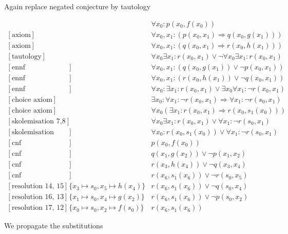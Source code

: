 \documentclass[onehalfspacing]{article}
\theoremstyle{definition}
\theoremstyle{definition}
\theoremstyle{definition}
\theoremstyle{definition}
\theoremstyle{definition}
\theoremstyle{definition}
\begin{document}
Again replace negated conjecture by tautology

\setcounter{equation}{0}
\begin{align}
	[\text{axiom}] && \forall x_0: p(x_0,f(x_0))\\
	[\text{axiom}] && \forall x_0, x_1 : (p(x_0,x_1) \Rightarrow q(x_0,g(x_1)))\\
	[\text{axiom}] && \forall x_0, x_1 : (q(x_0,x_1) \Rightarrow r(x_0,h(x_1)))\\
	[\text{tautology}] &&\forall  x_0 \exists x_1 : r(x_0,x_1)\vee \neg\forall  x_0 \exists x_1 : r(x_0,x_1)\\
	[\text{ennf transformation 2}] && \forall x_0, x_1 : (q(x_0,g(x_1)) \vee \neg p(x_0,x_1)) \\
	[\text{ennf transformation 3}] &&\forall x_0, x_1 : (r(x_0,h(x_1)) \vee \neg q(x_0, x_1)) \\
	[\text{ennf transformation 4}] && \forall  x_0 : \exists x_1 : r(x_0,x_1)\vee \exists x_0 \forall x_1 : \neg r(x_0, x_1)\\
	[\text{choice axiom}] && \exists x_0 : \forall x_1 : \neg r(x_0, x_1) \Rightarrow \forall x_1 : \neg r(s_0,x_1)\\
	[\text{choice axiom}] &&\forall x_0(\exists x_1: r(x_0, x_1)\Rightarrow r(x_0, s_1(x_0)))\\
	[\text{skolemisation 7,8}] && \forall  x_0 \exists x_1 : r(x_0,x_1)\vee \forall x_1 : \neg r(s_0, x_1)\\
	[\text{skolemisation 9,10}] && \forall  x_0 :  r(x_0, s_1(x_0))\vee \forall x_1 : \neg r(s_0, x_1)\\
	[\text{cnf transformation 1}] && p(x_0,f(x_0))\\
	[\text{cnf transformation 5}] && q(x_1,g(x_2)) \vee \neg p(x_1, x_2)\\
	[\text{cnf transformation 6}] && r(x_3,h(x_4)) \vee \neg q(x_3, x_4)\\
	[\text{cnf transformation 11}] && r(x_6, s_1(x_6))\vee\neg r(s_0, x_5)\\
	[\text{resolution 14, 15}] &\{x_3\mapsto s_0, x_5\mapsto h(x_4)\}&r(x_6, s_1(x_6))\vee \neg q(s_0,x_4)\\
	[\text{resolution 16, 13}] &\{x_1\mapsto s_0, x_4\mapsto g(x_2)\}&r(x_6, s_1(x_6))\vee\neg p(s_0,x_2)\\
	[\text{resolution 17, 12}] &\{x_0\mapsto s_0, x_2\mapsto f(s_0)\}&r(x_6, s_1(x_6))
\end{align}

We propagate the substitutions
\end{document}
